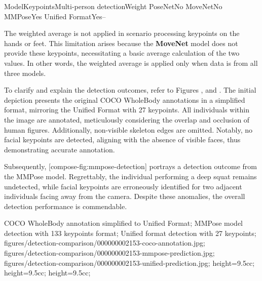  \setupTABLE[r][1][style=bold]
 \setupTABLE[c][each][offset=3dd]
 \setupTABLE[frame=off]
 \setupTABLE[r][1][topframe=on,bottomframe=on]
 \setupTABLE[c][each][leftframe=on]
 \setupTABLE[c][1][leftframe=off]
 \setupTABLE[c][2,3,4][align=middle]
 \bTR\bTD Model\eTD\bTD Keypoints\eTD\bTD Multi-person detection\eTD\bTD Weight\eTD\eTR
 \bTR\bTD PoseNet\eTD{}\eTD\bTD No\eTD{}\eTD\eTR
 \bTR\bTD MoveNet\eTD{}\eTD\bTD No\eTD{}\eTD\eTR
 \bTR\bTD MMPose\eTD{}\eTD\bTD Yes\eTD{}\eTD\eTR
 \bTR\bTD Unified Format\eTD{}\eTD\bTD Yes\eTD\bTD --\eTD\eTR


The weighted average is not applied in scenario processing keypoints on the hands or feet. This limitation arises because the {\bf MoveNet} model does not provide these keypoints, necessitating a basic average calculation of the two values. In other words, the weighted average is applied only when data is from all three models.

To clarify and explain the detection outcomes, refer to Figures ,  and . The initial depiction presents the original COCO WholeBody annotations in a simplified format, mirroring the Unified Format with 27 keypoints. All individuals within the image are annotated, meticulously considering the overlap and occlusion of human figures. Additionally, non-visible skeleton edges are omitted. Notably, no facial keypoints are detected, aligning with the absence of visible faces, thus demonstrating accurate annotation.

Subsequently, [compose-fig:mmpose-detection] portrays a detection outcome from the MMPose model. Regrettably, the individual performing a deep squat remains undetected, while facial keypoints are erroneously identified for two adjacent individuals facing away from the camera. Despite these anomalies, the overall detection performance is commendable.

 {
 COCO WholeBody annotation simplified to Unified Format;
 MMPose model detection with 133 keypoints format;
 Unified format detection with 27 keypoints;
 }
 {
 figures/detection-comparison/000000002153-coco-annotation.jpg;
 figures/detection-comparison/000000002153-mmpose-prediction.jpg;
 figures/detection-comparison/000000002153-unified-prediction.jpg;
 }
 {
 height=9.5cc;
 height=9.5cc;
 height=9.5cc;
 }


